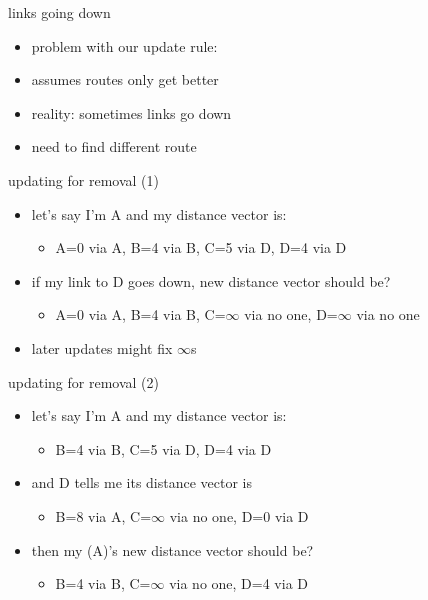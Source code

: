 \usetikzlibrary{arrows.meta,matrix}

\providecommand{\noroute}{$\infty$/---}
\providecommand{\mymark}[2]{\alt<#1->{\myemph<#1>{#2}}{}}


\begin{frame}{links going down}
    \begin{itemize}
    \item problem with our update rule:
    \item assumes routes only get better
    \vspace{.5cm}
    \item reality: sometimes links go down
    \item need to find different route
    \end{itemize}
\end{frame}

\begin{frame}{updating for removal (1)}
    \begin{itemize}
    \item let's say I'm A and my distance vector is:
        \begin{itemize}
        \item A=0 via A, B=4 via B, C=5 via D, D=4 via D
        \end{itemize}
    \item if my link to D goes down, new distance vector should be?
        \begin{itemize}
        \item<2-> A=0 via A, B=4 via B, C=$\infty$ via no one, D=$\infty$ via no one
        \end{itemize}
    \vspace{.5cm}
    \item<2-> later updates might fix $\infty$s
    \end{itemize}
\end{frame}

\begin{frame}{updating for removal (2)}
    \begin{itemize}
    \item let's say I'm A and my distance vector is:
        \begin{itemize}
        \item B=4 via B, C=5 via D, D=4 via D
        \end{itemize}
    \item and D tells me its distance vector is
        \begin{itemize}
        \item B=8 via A, C=$\infty$ via no one, D=0 via D
        \end{itemize}
    \item then my (A)'s new distance vector should be?
        \begin{itemize}
        \item<2->B=4 via B, C=$\infty$ via no one, D=4 via D
        \end{itemize}
    \end{itemize}
\end{frame}

